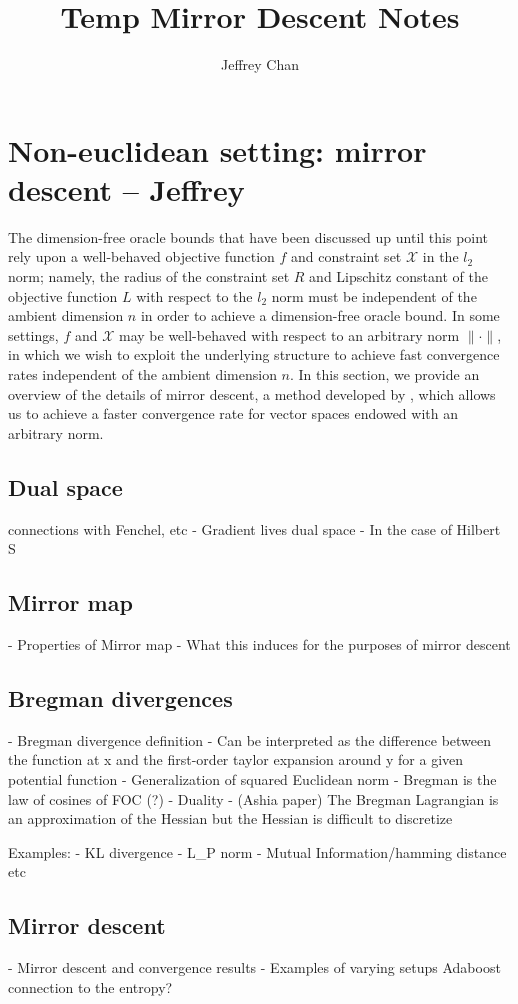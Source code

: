 \documentclass{article}
\title{Temp Mirror Descent Notes}
\author{Jeffrey Chan}
\begin{document}
\maketitle

\section{Non-euclidean setting: mirror descent -- Jeffrey}
The dimension-free oracle bounds that have been discussed up until this point rely upon a well-behaved objective function $f$ and constraint set $\mathcal{X}$ in the $l_2$ norm; namely, the radius of the constraint set $R$ and Lipschitz constant of the objective function $L$ with respect to the $l_2$ norm must be independent of the ambient dimension $n$ in order to achieve a dimension-free oracle bound. In some settings, $f$ and $\mathcal{X}$ may be well-behaved with respect to an arbitrary norm $\|\cdot \|$, in which we wish to exploit the underlying structure to achieve fast convergence rates independent of the ambient dimension $n$. In this section, we provide an overview of the details of mirror descent, a method developed by \cite{blair1985problem}, which allows us to achieve a faster convergence rate for vector spaces endowed with an arbitrary norm. 


\subsection{Dual space}
connections with Fenchel, etc
- Gradient lives dual space
- In the case of Hilbert S

\subsection{Mirror map}
- Properties of Mirror map
- What this induces for the purposes of mirror descent

\subsection{Bregman divergences}
 - Bregman divergence definition
 - Can be interpreted as the difference between the function at x and the first-order taylor expansion around y for a given potential function
 - Generalization of squared Euclidean norm
 - Bregman is the law of cosines of FOC (?)
 - Duality
 - (Ashia paper) The Bregman Lagrangian is an approximation of the Hessian but the Hessian is difficult to discretize

Examples:
- KL divergence
- L_P norm
- Mutual Information/hamming distance etc

\subsection{Mirror descent}
- Mirror descent and convergence results
- Examples of varying setups
Adaboost connection to the entropy?



\end{document}
